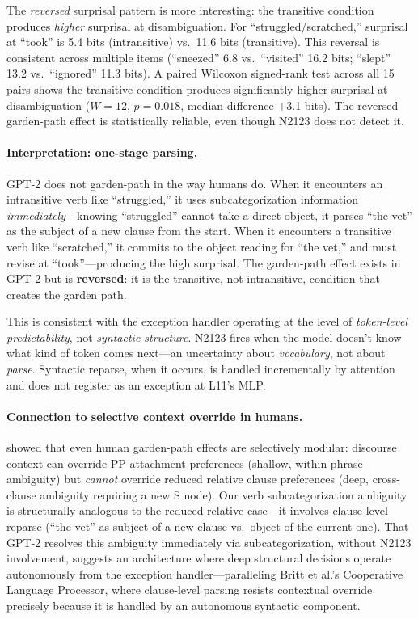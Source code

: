 \documentclass{article}
\begin{document}
The \emph{reversed} surprisal pattern is more interesting: the transitive
condition produces \emph{higher} surprisal at disambiguation.
For ``struggled/scratched,'' surprisal at ``took'' is 5.4 bits
(intransitive) vs.\ 11.6 bits (transitive).
This reversal is consistent across multiple items (``sneezed'' 6.8 vs.\
``visited'' 16.2 bits; ``slept'' 13.2 vs.\ ``ignored'' 11.3 bits).
A paired Wilcoxon signed-rank test across all 15 pairs shows the transitive
condition produces significantly higher surprisal at disambiguation
($W = 12$, $p = 0.018$, median difference $+$3.1 bits).
The reversed garden-path effect is statistically reliable, even though N2123
does not detect it.

\paragraph{Interpretation: one-stage parsing.}
GPT-2 does not garden-path in the way humans do.
When it encounters an intransitive verb like ``struggled,'' it uses
subcategorization information \emph{immediately}---knowing ``struggled'' cannot
take a direct object, it parses ``the vet'' as the subject of a new clause
from the start.
When it encounters a transitive verb like ``scratched,'' it commits to the
object reading for ``the vet,'' and must revise at ``took''---producing the
high surprisal.
The garden-path effect exists in GPT-2 but is \textbf{reversed}: it is the
transitive, not intransitive, condition that creates the garden path.

This is consistent with the exception handler operating at the level of
\emph{token-level predictability}, not \emph{syntactic structure}.
N2123 fires when the model doesn't know what kind of token comes next---an
uncertainty about \emph{vocabulary}, not about \emph{parse}.
Syntactic reparse, when it occurs, is handled incrementally by attention
and does not register as an exception at L11's MLP.

\paragraph{Connection to selective context override in humans.}
\citet{britt1992parsing} showed that even human garden-path effects are
selectively modular: discourse context can override PP attachment preferences
(shallow, within-phrase ambiguity) but \emph{cannot} override reduced relative
clause preferences (deep, cross-clause ambiguity requiring a new S node).
Our verb subcategorization ambiguity is structurally analogous to the
reduced relative case---it involves clause-level reparse (``the vet'' as
subject of a new clause vs.\ object of the current one).
That GPT-2 resolves this ambiguity immediately via subcategorization,
without N2123 involvement, suggests an architecture where deep structural
decisions operate autonomously from the exception handler---paralleling
Britt et al.'s Cooperative Language Processor, where clause-level parsing
resists contextual override precisely because it is handled by an
autonomous syntactic component.
\end{document}
